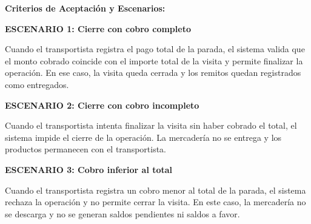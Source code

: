 \documentclass[a4paper,9pt]{article}
\begin{document}
\begin{tcolorbox}
{\begin{itemize}[leftmargin=12pt, nosep, itemsep=1.5pt, topsep=1pt]
\end{itemize}
}\par\vspace{3pt}
\noindent\textbf{\footnotesize Criterios de Aceptación y Escenarios:}\par\vspace{2pt}
{\footnotesize
\noindent\textbf{\textcolor{secondarydark}{ESCENARIO 1:  Cierre con cobro completo}}\par\vspace{1pt}
Cuando el transportista registra el pago total de la parada, el sistema valida que el monto cobrado coincide con el importe total de la visita y permite finalizar la operación. En ese caso, la visita queda cerrada y los remitos quedan registrados como entregados.\par\vspace{2.5pt}
\noindent\textbf{\textcolor{secondarydark}{ESCENARIO 2:  Cierre con cobro incompleto}}\par\vspace{1pt}
Cuando el transportista intenta finalizar la visita sin haber cobrado el total, el sistema impide el cierre de la operación. La mercadería no se entrega y los productos permanecen con el transportista.\par\vspace{2.5pt}
\noindent\textbf{\textcolor{secondarydark}{ESCENARIO 3:  Cobro inferior al total}}\par\vspace{1pt}
Cuando el transportista registra un cobro menor al total de la parada, el sistema rechaza la operación y no permite cerrar la visita. En este caso, la mercadería no se descarga y no se generan saldos pendientes ni saldos a favor.\par\vspace{2.5pt}
}\par
\end{tcolorbox}
\end{document}
